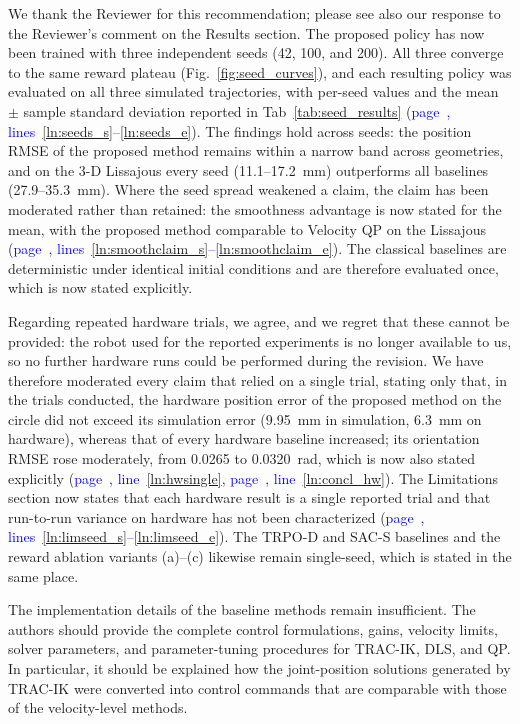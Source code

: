 \documentclass[11pt]{elsarticle}
\newcommand{\mline}[1]{\textcolor{blue}{page~\pageref{#1}, line~\ref{#1}}}
\newcommand{\mlines}[2]{\textcolor{blue}{page~\pageref{#1}, lines~\ref{#1}--\ref{#2}}}
\begin{document}
\begin{responsebox}
We thank the Reviewer for this recommendation; please see also our response to the Reviewer's comment on the Results section. The proposed policy has now been trained with three independent seeds (42, 100, and 200). All three converge to the same reward plateau (Fig.~\ref{fig:seed_curves}), and each resulting policy was evaluated on all three simulated trajectories, with per-seed values and the mean $\pm$ sample standard deviation reported in Tab~\ref{tab:seed_results} (\mlines{ln:seeds_s}{ln:seeds_e}). The findings hold across seeds: the position RMSE of the proposed method remains within a narrow band across geometries, and on the 3-D Lissajous every seed (11.1--17.2~mm) outperforms all baselines (27.9--35.3~mm). Where the seed spread weakened a claim, the claim has been moderated rather than retained: the smoothness advantage is now stated for the mean, with the proposed method comparable to Velocity QP on the Lissajous (\mlines{ln:smoothclaim_s}{ln:smoothclaim_e}). The classical baselines are deterministic under identical initial conditions and are therefore evaluated once, which is now stated explicitly.

Regarding repeated hardware trials, we agree, and we regret that these cannot be provided: the robot used for the reported experiments is no longer available to us, so no further hardware runs could be performed during the revision. We have therefore moderated every claim that relied on a single trial, stating only that, in the trials conducted, the hardware position error of the proposed method on the circle did not exceed its simulation error (9.95~mm in simulation, 6.3~mm on hardware), whereas that of every hardware baseline increased; its orientation RMSE rose moderately, from 0.0265 to 0.0320~rad, which is now also stated explicitly (\mline{ln:hwsingle}, \mline{ln:concl_hw}). The Limitations section now states that each hardware result is a single reported trial and that run-to-run variance on hardware has not been characterized (\mlines{ln:limseed_s}{ln:limseed_e}). The TRPO-D and SAC-S baselines and the reward ablation variants (a)--(c) likewise remain single-seed, which is stated in the same place.
\end{responsebox}

\begin{reviewerbox}[Comment R1.8]
The implementation details of the baseline methods remain insufficient. The authors should provide the complete control formulations, gains, velocity limits, solver parameters, and parameter-tuning procedures for TRAC-IK, DLS, and QP. In particular, it should be explained how the joint-position solutions generated by TRAC-IK were converted into control commands that are comparable with those of the velocity-level methods.
\end{reviewerbox}
\end{document}
